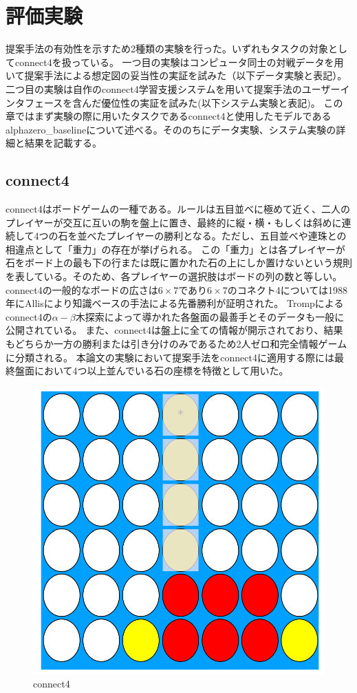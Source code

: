 \chapter{評価実験}
提案手法の有効性を示すため2種類の実験を行った。いずれもタスクの対象としてconnect4を扱っている。
一つ目の実験はコンピュータ同士の対戦データを用いて提案手法による想定図の妥当性の実証を試みた（以下データ実験と表記）。
二つ目の実験は自作のconnect4学習支援システムを用いて提案手法のユーザーインタフェースを含んだ優位性の実証を試みた(以下システム実験と表記)。
この章ではまず実験の際に用いたタスクであるconnect4と使用したモデルであるalphazero\_baselineについて述べる。そののちにデータ実験、システム実験の詳細と結果を記載する。
\section{connect4\cite{connect4}}
connect4はボードゲームの一種である。ルールは五目並べに極めて近く、二人のプレイヤーが交互に互いの駒を盤上に置き、最終的に縦・横・もしくは斜めに連続して4つの石を並べたプレイヤーの勝利となる。ただし、五目並べや連珠との相違点として「重力」の存在が挙げられる。
この「重力」とは各プレイヤーが石をボード上の最も下の行または既に置かれた石の上にしか置けないという規則を表している。そのため、各プレイヤーの選択肢はボードの列の数と等しい。
connect4の一般的なボードの広さは$6\times7$であり$6\times7$のコネクト4については1988年にAllis\cite{allis}により知識ベースの手法による先番勝利が証明された。
Tromp\cite{data}によるconnect4の$\alpha-\beta$木探索によって導かれた各盤面の最善手とそのデータも一般に公開されている。
また、connect4は盤上に全ての情報が開示されており、結果もどちらか一方の勝利または引き分けのみであるため2人ゼロ和完全情報ゲームに分類される。
本論文の実験において提案手法をconnect4に適用する際には最終盤面において4つ以上並んでいる石の座標を特徴として用いた。
\begin{figure}[t]
	\centering
	\includegraphics[width=\linewidth]{./figure/connect4.png}
	\caption{connect4}
	\label{fig:connect4}
\end{figure}
